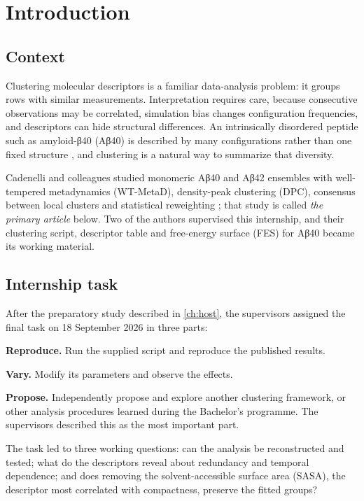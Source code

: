 \chapter{Introduction}
\label{ch:intro}
\section{Context}
Clustering molecular descriptors is a familiar data-analysis problem: it groups rows with similar measurements. Interpretation requires care, because consecutive observations may be correlated, simulation bias changes configuration frequencies, and descriptors can hide structural differences. An intrinsically disordered peptide such as amyloid-β40 (Aβ40) is described by many configurations rather than one fixed structure \autocite{vanderlee2014}, and clustering is a natural way to summarize that diversity.

Cadenelli and colleagues studied monomeric Aβ40 and Aβ42 ensembles with well-tempered metadynamics (WT-MetaD), density-peak clustering (DPC), consensus between local clusters and statistical reweighting \autocite{cadenelli2026}; that study is called \emph{the primary article} below. Two of the authors supervised this internship, and their clustering script, descriptor table and free-energy surface (FES) for Aβ40 became its working material.

\section{Internship task}
\label{sec:task}
After the preparatory study described in \cref{ch:host}, the supervisors assigned the final task on 18 September 2026 in three parts:
\begin{protocolsteps}
\item \textbf{Reproduce.} Run the supplied script and reproduce the published results.
\item \textbf{Vary.} Modify its parameters and observe the effects.
\item \textbf{Propose.} Independently propose and explore another clustering framework, or other analysis procedures learned during the Bachelor's programme. The supervisors described this as the most important part.
\end{protocolsteps}
The task led to three working questions: can the analysis be reconstructed and tested; what do the descriptors reveal about redundancy and temporal dependence; and does removing the solvent-accessible surface area (SASA), the descriptor most correlated with compactness, preserve the fitted groups?

